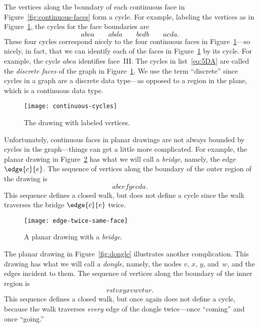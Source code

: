 The vertices along the boundary of each continuous face in
Figure~\ref{fig:continuous-faces} form a cycle.  For example, labeling the
vertices as in Figure~\ref{fig:continuous-cycles}, the cycles for the face
boundaries are
\begin{equation}\label{eq:5DA}
abca \qquad abda \qquad bcdb \qquad acda.
\end{equation}
These four cycles correspond nicely to the four continuous faces in
Figure~\ref{fig:continuous-cycles}---so nicely, in fact, that we can
identify each of the faces in Figure~\ref{fig:continuous-cycles} by
its cycle.  For example, the cycle $abca$ identifies
face~III\@.  The cycles in list~\ref{eq:5DA} are called the
\emph{discrete faces} of the graph in
Figure~\ref{fig:continuous-cycles}.  We use the term ``discrete''
since cycles in a graph are a discrete data type---as opposed to a
region in the plane, which is a continuous data type.

\begin{figure}\redrawn


\texttt{[image: continuous-cycles]}

\caption{The drawing with labeled vertices.}
\label{fig:continuous-cycles}
\end{figure}

Unfortunately, continuous faces in planar drawings are not always
bounded by cycles in the graph---things can get a little more
complicated.  For example, the planar drawing in
Figure~\ref{fig:bridge} has what we will call a \emph{bridge}, namely,
the edge $\edge{c}{e}$.  The sequence of vertices along the boundary
of the outer region of the drawing is
\[
abcefgecda.
\]
This sequence defines a closed walk, but does not define a cycle since
the walk traverses the bridge $\edge{c}{e}$ twice.

\begin{figure}\redrawn

\texttt{[image: edge-twice-same-face]}

\caption{A planar drawing with a \emph{bridge}.}
\label{fig:bridge}
\end{figure}

The planar drawing in Figure~\ref{fig:dongle} illustrates another
complication.  This drawing has what we will call a \emph{dongle},
namely, the nodes $v$, $x$, $y$, and~$w$, and the edges incident to
them.  The sequence of vertices along the boundary
of the inner region is
\[
rstvxyxvwvtur.
\]
This sequence defines a closed walk, but once again does not define a
cycle, because the walk traverses \emph{every} edge of the dongle
twice---once ``coming'' and once ``going.''

